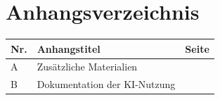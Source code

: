 {}
\section*{Anhangsverzeichnis}

\begin{tabularx}{\textwidth}{l X r}
  \toprule
  \textbf{Nr.} & \textbf{Anhangstitel} & \textbf{Seite} \\
  \midrule
  A & Zusätzliche Materialien & \pageref{app:materialien} \\
  B & Dokumentation der KI-Nutzung & \pageref{app:ki} \\
  \bottomrule
\end{tabularx}
